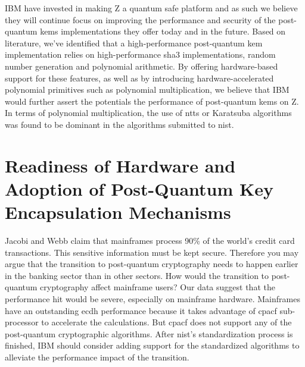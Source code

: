 IBM have invested in making Z a quantum safe platform \cite{ibm:z15:2019} and as such we believe they will continue focus on improving the performance and security of the \gls{post-quantum} \glspl{kem} implementations they offer today and in the future. Based on literature, we've identified that a high-performance \gls{post-quantum} \gls{kem} implementation relies on high-performance \gls{sha3} implementations, random number generation and polynomial arithmetic. By offering hardware-based support for these features, as well as by introducing hardware-accelerated polynomial primitives such as polynomial multiplication, we believe that IBM would further assert the potentials the performance of \gls{post-quantum} \glspl{kem} on Z. In terms of polynomial multiplication, the use of \glspl{ntt} or Karatsuba algorithms was found to be dominant in the algorithms submitted to \gls{nist}.



\section{Readiness of Hardware and Adoption of Post-Quantum Key Encapsulation Mechanisms}

Jacobi and Webb \cite{jacobi2020} claim that mainframes process 90\% of the world's credit card transactions. This sensitive information must be kept secure. Therefore you may argue that the transition to post-quantum cryptography needs to happen earlier in the banking sector than in other sectors. How would the transition to post-quantum cryptography affect mainframe users? Our data suggest that the performance hit would be severe, especially on mainframe hardware. Mainframes have an outstanding \gls{ecdh} performance because it takes advantage of \gls{cpacf} sub-processor to accelerate the calculations. But \gls{cpacf} does not support any of the post-quantum cryptographic algorithms. After \gls{nist}'s standardization process is finished, IBM should consider adding support for the standardized algorithms to alleviate the performance impact of the transition.


